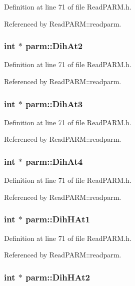 Definition at line 71 of file Read\-PARM.h.

Referenced by Read\-PARM::readparm.
\subsubsection{\setlength{\rightskip}{0pt plus 5cm}int $\ast$ parm::Dih\-At2}\label{structparm_m82}




Definition at line 71 of file Read\-PARM.h.

Referenced by Read\-PARM::readparm.
\subsubsection{\setlength{\rightskip}{0pt plus 5cm}int $\ast$ parm::Dih\-At3}\label{structparm_m83}




Definition at line 71 of file Read\-PARM.h.

Referenced by Read\-PARM::readparm.
\subsubsection{\setlength{\rightskip}{0pt plus 5cm}int $\ast$ parm::Dih\-At4}\label{structparm_m84}




Definition at line 71 of file Read\-PARM.h.

Referenced by Read\-PARM::readparm.
\subsubsection{\setlength{\rightskip}{0pt plus 5cm}int $\ast$ parm::Dih\-HAt1}\label{structparm_m76}




Definition at line 71 of file Read\-PARM.h.

Referenced by Read\-PARM::readparm.
\subsubsection{\setlength{\rightskip}{0pt plus 5cm}int $\ast$ parm::Dih\-HAt2}\label{structparm_m77}




